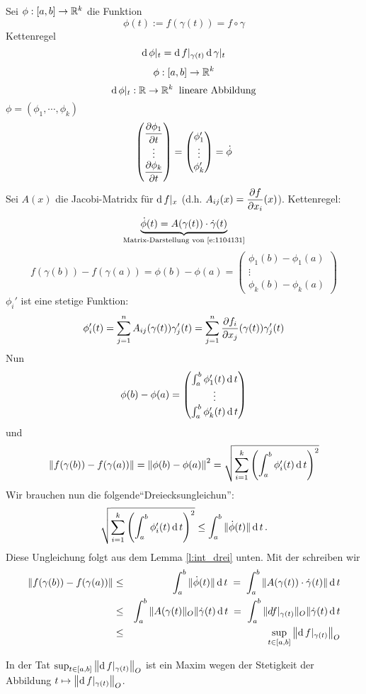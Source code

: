 \begin{Bew}
  Sei $\phi:[a,b]\rightarrow\mathbb{R}^k$ die Funktion
  \[\phi(t):=f(\gamma(t))=f\circ\gamma\]
  Kettenregel
  \begin{equation}
    \label{e:1104131}
    \operatorname{d} \phi|_t=\operatorname{d} f|_{\gamma(t)}\operatorname{d} \gamma|_t
  \end{equation}
  \[\phi:[a,b]\rightarrow\mathbb{R}^k\]
  \[\operatorname{d} \phi|_t:\mathbb{R}\rightarrow\mathbb{R}^k\hspace{2mm}\text{lineare Abbildung}\]
  $\phi=(\phi_1,\cdots,\phi_k)$
  \[ \begin{pmatrix}
    \dfrac{\partial \phi_1}{\partial t} \\ \vdots \\ \dfrac{\partial \phi_k}{\partial t} 
  \end{pmatrix} = \begin{pmatrix}
    \phi_1' \\ \vdots \\ \phi_k'
  \end{pmatrix} = \dot\phi \]
  Sei $A (x)$ die Jacobi-Matridx für $\operatorname{d} f|_x$ (d.h.  $A_{ij} (x) = \dfrac{\partial f}{\partial x_i} (x)$). 
Kettenregel:
  \[\underbrace{\dot\phi(t)=A(\gamma(t))\cdot \dot\gamma(t)}_{\text{Matrix-Darstellung von \eqref{e:1104131}}}\]
  \[f(\gamma(b))-f(\gamma(a))=\phi(b)-\phi(a)= \begin{pmatrix}
    \phi_1(b)-\phi_1(a) \\
    \vdots \\
    \phi_k(b)-\phi_k(a)
  \end{pmatrix}\]
  $\phi_i'$ ist eine stetige Funktion:
 \[
    \phi_i'(t)=\sum_{j=1}^nA_{ij}(\gamma(t))\gamma_j'(t) =
    \sum_{j=1}^n\dfrac{\partial f_i}{\partial x_j}(\gamma(t))\gamma_j'(t)
 \]
Nun
  \[\phi(b)-\phi(a)= \begin{pmatrix}
    \int_a^b\phi_1'(t)\operatorname{d} t\\
    \vdots \\
    \int_a^b\phi_k'(t)\operatorname{d} t
  \end{pmatrix} \]
und
 \[
    \left\| f(\gamma(b))-f(\gamma(a)) \right\|= \left\| \phi(b)-\phi(a) \right\|^2
    =\sqrt{\sum^k_{i=1}\left( \int_a^b\phi_i'(t)\operatorname{d} t \right)^2}
\]
Wir brauchen nun die folgende``Dreiecksungleichun'':
\begin{equation}\label{e:int_drei}
\sqrt{\sum^k_{i=1}\left( \int_a^b\phi_i'(t)\operatorname{d} t \right)^2}
\leq \int_a^b \|\dot\phi (t)\| \operatorname{d} t\, .
\end{equation}
Diese Ungleichung folgt aus dem Lemma \ref{l:int_drei} unten.
Mit der schreiben wir
\begin{eqnarray*}
   \left\| f(\gamma(b))-f(\gamma(a)) \right\|&\leq& \int_a^b \|\dot\phi (t)\| \operatorname{d} t
\;=\;  \int_a^b \| A (\gamma (t))\cdot \dot{\gamma} (t)\|\operatorname{d} t\\
&\leq& \int_a^b \|A (\gamma (t)\|_O \|\dot{\gamma} (t)\operatorname{d} t
\;=\ \int_a^b \|df|_{\gamma (t)}\|_O \|\dot{\gamma} (t)\operatorname{d} t\\
&\leq& \sup_{t\in [a,b]}\left\| \operatorname{d} f|_{\gamma(t)} \right\|_O
\end{eqnarray*}
\end{Bew}
\begin{Bem} In der Tat $\sup_{t\in [a,b]}\left\| \operatorname{d} f|_{\gamma(t)} \right\|_O$ ist
ein Maxim wegen der Stetigkeit der Abbildung $t\mapsto \left\| \operatorname{d} f|_{\gamma(t)} \right\|_O$.
\end{Bem}

